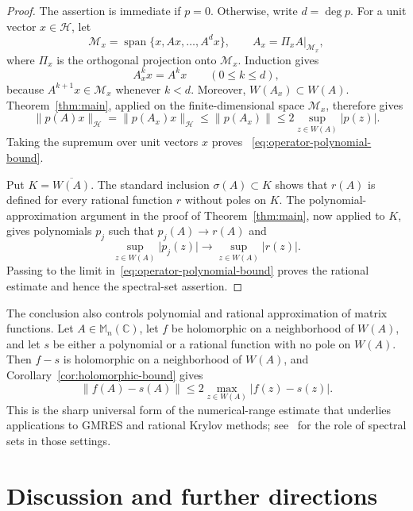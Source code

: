 \documentclass{aomart}
\theoremstyle{definition}
\newcommand{\C}{\mathbb C}
\newcommand{\Mn}{\mathbb M_n(\C)}
\begin{document}
\begin{proof}
The assertion is immediate if $p=0$.  Otherwise, write $d=\deg p$.
For a unit vector $x\in\mathcal H$, let
\[
  \mathcal M_x=\operatorname{span}\{x,Ax,\ldots,A^d x\},
  \qquad
  A_x=\left.\Pi_x A\right|_{\mathcal M_x},
\]
where $\Pi_x$ is the orthogonal projection onto
$\mathcal M_x$.  Induction gives
\begin{equation}
  A_x^k x=A^k x \qquad(0\leq k\leq d),
  \label{eq:Krylov-agreement}
\end{equation}
because $A^{k+1}x\in\mathcal M_x$ whenever $k<d$.  Moreover,
$W(A_x)\subset W(A)$.  Theorem~\ref{thm:main}, applied on the
finite-dimensional space $\mathcal M_x$, therefore gives
\[
  \lVert p(A)x\rVert_{\mathcal H}
  =\lVert p(A_x)x\rVert_{\mathcal H}
  \leq\lVert p(A_x)\rVert
  \leq2\sup_{z\in W(A)}\lvert p(z)\rvert.
\]
Taking the supremum over unit vectors $x$ proves~%
\eqref{eq:operator-polynomial-bound}.

Put $K=\overline{W(A)}$.  The standard inclusion
$\sigma(A)\subset K$ shows that $r(A)$ is defined for every rational
function $r$ without poles on $K$.  The polynomial-approximation
argument in the proof of Theorem~\ref{thm:main}, now applied to $K$,
gives polynomials $p_j$ such that $p_j(A)\to r(A)$ and
\[
  \sup_{z\in W(A)}\lvert p_j(z)\rvert
  \longrightarrow
  \sup_{z\in W(A)}\lvert r(z)\rvert.
\]
Passing to the limit in~\eqref{eq:operator-polynomial-bound} proves the
rational estimate and hence the spectral-set assertion.
\end{proof}

The conclusion also controls polynomial and rational approximation of
matrix functions.  Let $A\in\Mn$, let $f$ be holomorphic on a
neighborhood of $W(A)$, and let $s$ be either a polynomial or a
rational function with no pole on $W(A)$.  Then $f-s$ is holomorphic on
a neighborhood of $W(A)$, and Corollary~\ref{cor:holomorphic-bound}
gives
\begin{equation}
  \lVert f(A)-s(A)\rVert
  \leq2\max_{z\in W(A)}\lvert f(z)-s(z)\rvert.
  \label{eq:matrix-function-error}
\end{equation}
This is the sharp universal form of the numerical-range estimate that
underlies applications to GMRES and rational Krylov methods; see~%
\cite{ChoiGreenbaum2015,CrouzeixGreenbaum2019,ChenGreenbaumTrogdon2025}
for the role of spectral sets in those settings.

\section{Discussion and further directions}
\label{sec:outlook}
\end{document}
